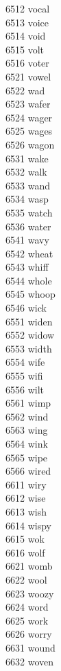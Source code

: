 6512 vocal \\
6513 voice \\
6514 void \\
6515 volt \\
6516 voter \\
6521 vowel \\
6522 wad \\
6523 wafer \\
6524 wager \\
6525 wages \\
6526 wagon \\
6531 wake \\
6532 walk \\
6533 wand \\
6534 wasp \\
6535 watch \\
6536 water \\
6541 wavy \\
6542 wheat \\
6543 whiff \\
6544 whole \\
6545 whoop \\
6546 wick \\
6551 widen \\
6552 widow \\
6553 width \\
6554 wife \\
6555 wifi \\
6556 wilt \\
6561 wimp \\
6562 wind \\
6563 wing \\
6564 wink \\
6565 wipe \\
6566 wired \\
6611 wiry \\
6612 wise \\
6613 wish \\
6614 wispy \\
6615 wok \\
6616 wolf \\
6621 womb \\
6622 wool \\
6623 woozy \\
6624 word \\
6625 work \\
6626 worry \\
6631 wound \\
6632 woven \\
